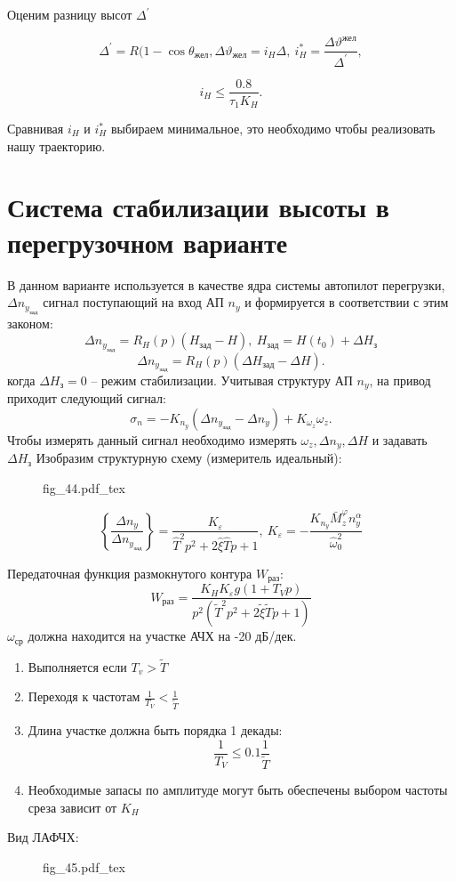 \documentclass{article}
\newcommand{\incfig}[1]{
    {#1.pdf_tex}
}
\begin{document}
Оценим разницу высот $\Delta^{'}$

\[
	\Delta^{'} = R(1 - \cos{\theta_\text{жел}}, \Delta \vartheta_\text{жел} = i_H \Delta, \ i_{H}^* = \frac{\Delta \vartheta^\text{жел}}{\Delta^{'}},
\]

\[
	i_H \le \frac{0.8}{\tau_1 K_H}
	.\]

Сравнивая $i_H$ и $i_H^*$ выбираем минимальное, это необходимо чтобы реализовать нашу траекторию.

\section{Система стабилизации высоты в перегрузочном варианте}
В данном варианте используется в качестве ядра системы автопилот перегрузки, $ \Delta n_{y_\text{зад}}$ сигнал поступающий на вход АП $n_y$ и формируется в соответствии с этим законом:
\[
	\Delta n_{y_\text{зад}} = R_H(p) (H_\text{зад} - H), \ H_\text{зад} = H(t_0) + \Delta H_\text{з}
\]
\[
	\Delta n_{y_\text{зад}} = R_H(p) (\Delta H_\text{зад} - \Delta H)
	.\]
когда $\Delta H_\text{з} = 0$ -- режим стабилизации. Учитывая структуру АП $n_y$, на привод приходит следующий сигнал:
\[
	\sigma_n = -K_{n_y} ( \Delta n_{y_\text{зад}} - \Delta n_y) + K_{\omega_z} \omega_z
	.\]
Чтобы измерять данный сигнал необходимо измерять $\omega_z, \Delta n_y, \Delta H$ и задавать $\Delta H_\text{з}$
Изобразим структурную схему (измеритель идеальный):
\begin{figure}[H]
	\centering
	\incfig{fig_44}
	\label{fig:fig_44}
\end{figure}
\[
	\left\{ \frac{ \Delta n_y}{ \Delta n_{y_\text{зад}}} \right\}  = \frac{K_\varepsilon}{ \hat{T}^2 p^2 + 2 \hat{\xi} \hat{T}p + 1 }, \ K_\varepsilon = - \frac{K_{n_y} \bar{M}_z^{\varphi} n_y^\alpha }{\hat{\omega}_0^2}
\]

Передаточная функция размокнутого контура $W_\text{раз}$:
\[
	W_\text{раз}  = \frac{K_H K_\varepsilon g (1 + T_V p)}{p^2 (\tilde{T}^2 p^2 + 2 \tilde{\xi} \tilde{T}p + 1)}
\]
$\omega_\text{ср}$ должна находится на участке АЧХ на -20 дБ/дек.
\begin{enumerate}
	\item Выполняется если $T_v > \tilde{T}$
	\item Переходя к частотам $\frac{1}{T_V} < \frac{1}{\tilde{T}}$
	\item Длина участке должна быть порядка 1 декады:
	      \[
		      \frac{1}{T_V} \le 0.1 \frac{1}{\tilde{T}}
	      \]
	\item Необходимые запасы по амплитуде могут быть обеспечены выбором частоты среза зависит от $K_H$
\end{enumerate}
Вид ЛАФЧХ:
\begin{figure}[H]
	\centering
	\incfig{fig_45}
	\label{fig:fig_45}
\end{figure}
\end{document}
